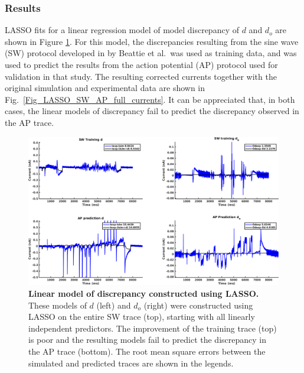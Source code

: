 \documentclass[11pt,a4paper,oneside]{article}
\begin{document}
\subsubsection{Results}

LASSO fits for a linear regression model of model discrepancy of $d$ and $d_o$ are shown in Figure \ref{Fig_LASSO_SW_AP_full_discrepancy}. For this model, the discrepancies resulting from the sine wave (SW) protocol developed in by Beattie et al.~was used as training data, and was used to predict the results from the action potential (AP) protocol used for validation in that study. The resulting corrected currents together with the original simulation and experimental data are shown in Fig.~\ref{Fig_LASSO_SW_AP_full_currents}. It can be appreciated that, in both cases, the linear models of discrepancy fail to predict the discrepancy observed in the AP trace.

\begin{figure}[t]
\begin{center}
\includegraphics[scale=0.42]{Figures/LASSO_SW_AP_full_discrepancy.png}
\caption{\textbf{Linear model of discrepancy constructed using LASSO.} These models of $d$ (left) and $d_o$ (right) were constructed using LASSO on the entire SW trace (top), starting with all linearly independent predictors. The improvement of the training trace (top) is poor and the resulting models fail to predict the discrepancy in the AP trace (bottom). The root mean square errors between the simulated and predicted traces are shown in the legends. } 
\label{Fig_LASSO_SW_AP_full_discrepancy}
\end{center}
\end{figure}
\end{document}
